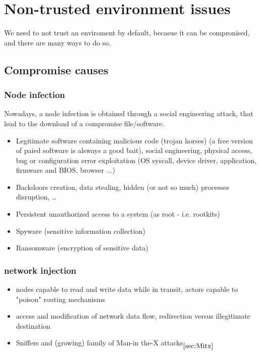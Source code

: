\chapter{Non-trusted environment issues}
We need to not trust an enviroment by default, becasue it can be compronised, and there are many ways to do so.

\section{Compromise causes}
\subsection{Node infection}
Nowadays, a node infection is obtained through a social engineering attack, that lead to the download of a compromise file/software.
\begin{itemize}[itemsep=0pt]
  \item Legitimate software containing malicious code (trojan horses) (a free version of paied software is alsways a good bait), social engineering, physical access, bug or configuration error exploitation (OS syscall, device driver, application, firmware and BIOS, browser ...)
  \item Backdoors creation, data stealing, hidden (or not so much) processes disruption, …
  \item Persistent unauthorized access to a system (as root - i.e. rootkits)
  \item Spyware (sensitive information collection)
  \item Ransomware (encryption of sensitive data)
\end{itemize}

\subsection{network injection}
\begin{itemize}[itemsep=0pt, topsep=0pt]
  \item nodes capable to read and write data while in transit, actors capable to "poison" routing mechanisms
  \item access and modification of network data flow, redirection versus illegitimate destination
  \item Sniffers and (growing) family of Man-in the-X  attacks$_{\ref{sec:Mitx}}$
\end{itemize}


